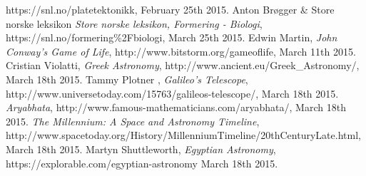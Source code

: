 \begin{thebibliography}{99}
		https://snl.no/platetektonikk,
		February 25th 2015.
		Anton Brøgger \& Store norske leksikon
		\emph{Store norske leksikon, Formering - Biologi},
		https://snl.no/formering\%2Fbiologi,
		March 25th 2015.
		Edwin Martin,
		\emph{John Conway's Game of Life},
		http://www.bitstorm.org/gameoflife,
		March 11th 2015.
		Cristian Violatti,
		\emph{Greek Astronomy},
		http://www.ancient.eu/Greek\_Astronomy/,
		March 18th 2015.
		Tammy Plotner ,
		\emph{Galileo's Telescope},
		http://www.universetoday.com/15763/galileos-telescope/,
		March 18th 2015.
		\emph{Aryabhata},
		http://www.famous-mathematicians.com/aryabhata/,
		March 18th 2015.
		\emph{The Millennium: A Space and Astronomy Timeline},
		http://www.spacetoday.org/History/MillenniumTimeline/20thCenturyLate.html,
		March 18th 2015.
		Martyn Shuttleworth,
		\emph{Egyptian Astronomy},
		https://explorable.com/egyptian-astronomy
		March 18th 2015.
\end{thebibliography}